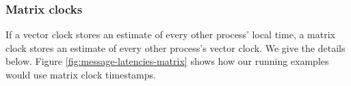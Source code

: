 \documentclass[]             %
{NASA}                       %
\theoremstyle{definition}
\begin{document}










\subsubsection{Matrix clocks}
If a vector clock stores an estimate of every other process' local
time, a matrix clock stores an estimate of every other process's
vector clock. We give the details below. Figure
\ref{fig:message-latencies-matrix} shows how our running examples
would use matrix clock timestamps.
\end{document}
